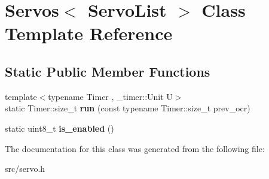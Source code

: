 \hypertarget{classServos}{}\section{Servos$<$ Servo\+List $>$ Class Template Reference}
\label{classServos}
\subsection*{Static Public Member Functions}
\begin{DoxyCompactItemize}
\item 
{\footnotesize template$<$typename Timer , \+\_\+timer\+::\+Unit U$>$ }\\static Timer\+::size\+\_\+t {\bfseries run} (const typename Timer\+::size\+\_\+t prev\+\_\+ocr)\hypertarget{classServos_a33b5784c1ea60c6df367f00e610bdaaf}{}\label{classServos_a33b5784c1ea60c6df367f00e610bdaaf}

\item 
static uint8\+\_\+t {\bfseries is\+\_\+enabled} ()\hypertarget{classServos_acd095cd7221ae58e3165f47ce7f8620d}{}\label{classServos_acd095cd7221ae58e3165f47ce7f8620d}

\end{DoxyCompactItemize}


The documentation for this class was generated from the following file\+:\begin{DoxyCompactItemize}
\item 
src/servo.\+h\end{DoxyCompactItemize}

